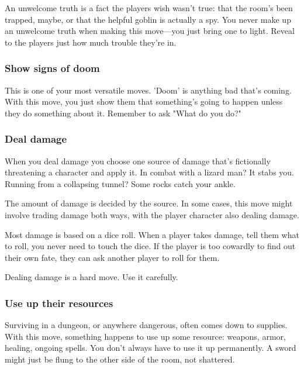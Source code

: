 An unwelcome truth is a fact the players wish wasn't true: that the room's been trapped, maybe, or that the helpful goblin is actually a spy. You never make up an unwelcome truth when making this move—you just bring one to light. Reveal to the players just how much trouble they're in.

       
\subsubsection{Show signs of doom}     
       

This is one of your most versatile moves. 'Doom' is anything bad that's coming. With this move, you just show them that something's going to happen unless they do something about it. Remember to ask "What do you do?"

       
\subsubsection{Deal damage}    
       

When you deal damage you choose one source of damage that's fictionally threatening a character and apply it. In combat with a lizard man? It stabs you. Running from a collapsing tunnel? Some rocks catch your ankle.

       

The amount of damage is decided by the source. In some cases, this move might involve trading damage both ways, with the player character also dealing damage.

       

Most damage is based on a dice roll. When a player takes damage, tell them what to roll, you never need to touch the dice. If the player is too cowardly to find out their own fate, they can ask another player to roll for them.

       

Dealing damage is a hard move. Use it carefully.

       
\subsubsection{Use up their resources}   
       

Surviving in a dungeon, or anywhere dangerous, often comes down to supplies. With this move, something happens to use up some resource: weapons, armor, healing, ongoing spells. You don't always have to use it up permanently. A sword might just be flung to the other side of the room, not shattered.

